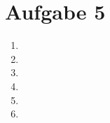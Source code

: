 \documentclass[12pt]{article}
\begin{document}
	\section{Aufgabe 5}
	\begin{enumerate}[label=(\alph*)]
		\item 
		\item
		\item
		\item
		\item
		\item
	\end{enumerate}
\end{document}
